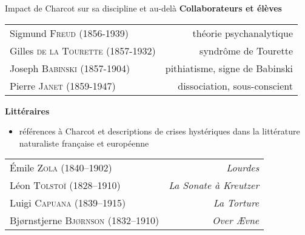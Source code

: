 \begin{frame}{Impact de Charcot sur sa discipline et au-delà}
\textbf{Collaborateurs et élèves}
\centering
    \begin{table}[!ht]
        \centering
        \small
        \begin{tabular}{l r}
           Sigmund \textsc{Freud} (1856-1939)  & théorie psychanalytique \\
            Gilles \textsc{de la Tourette} (1857-1932) & syndrôme de Tourette \\
            Joseph \textsc{Babinski} (1857-1904) & pithiatisme, signe de Babinski \\
            Pierre \textsc{Janet} (1859-1947) & dissociation, sous-conscient 
        \end{tabular}
        \begin{flushright}
        \footnotesize\citep{bogousslavsky2020}
        \end{flushright}
        \label{tab:my_label}
    \end{table}
\medskip
\textbf{Littéraires} 
\begin{itemize}
\item références à Charcot et descriptions de crises hystériques dans la littérature naturaliste française et européenne
\end{itemize}
\begin{table}[!ht]
    \centering
    \small
    \begin{tabular}{l r}
        Émile \textsc{Zola} (1840–1902)  & \textit{Lourdes} \\
        Léon \textsc{Tolstoï} (1828–1910) & \textit{La Sonate à Kreutzer} \\
        Luigi \textsc{Capuana} (1839–1915) & \textit{La Torture} \\
        Bjørnstjerne \textsc{Bjørnson} (1832–1910) & \textit{Over Ævne}
    \end{tabular}
            \begin{flushright}
        \footnotesize\citep{koehler2013charcot}
        \end{flushright}
    \label{tab:my_label}
\end{table}

\end{frame}

